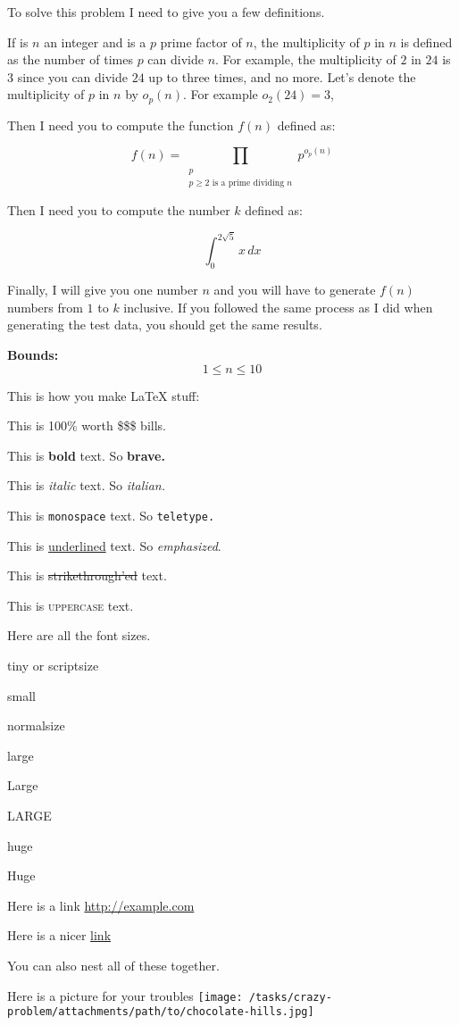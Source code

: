To solve this problem I need to give you a few definitions.

If is \(n\) an integer and is a \(p\) prime factor of \(n\), the multiplicity of \(p\) in \(n\) is defined as the number of times \(p\) can divide \(n\). For example, the multiplicity of $2$ in $24$ is $3$ since you can divide $24$ up to three times, and no more. Let's denote the multiplicity of $p$ in $n$ by $o_p(n)$. For example \(o_2(24) = 3\), 

Then I need you to compute the function $f(n)$ defined as:

$$f(n) = \prod_{\substack{p \\ p \geq 2 \text{ is a prime dividing } n}} p^{o_p(n)}$$

Then I need you to compute the number $k$ defined as:

\[\int_{0}^{2\sqrt{5}} x \, dx\]

Finally, I will give you one number $n$ and you will have to generate $f(n)$ numbers from $1$ to $k$ inclusive. If you followed the same process as I did when generating the test data, you should get the same results.

\large{\bf{Bounds:}}
$$ 1 \le n \le 10 $$

This is how you make LaTeX stuff:

This is 100\% worth \$\$\$ bills.

This is \textbf{bold} text. So \bf{brave}.

This is \textit{italic} text. So \it{italian}.

This is \texttt{monospace} text. So \tt{teletype}.

This is \underline{underlined} text. So \emph{emphasized}.

This is \sout{strikethrough'ed} text.

This is \textsc{uppercase} text.

Here are all the font sizes.

\tiny{tiny} or \scriptsize{scriptsize}

\small{small}

\normalsize{normalsize}

\large{large}

\Large{Large}

\LARGE{LARGE}

\huge{huge}

\Huge{Huge}


Here is a link \url{http://example.com}

Here is a nicer \href{http://example.com}{link}

You can also nest all of these together. \href{http://example.com}{}

Here is a picture for your troubles \texttt{[image: /tasks/crazy-problem/attachments/path/to/chocolate-hills.jpg]}

